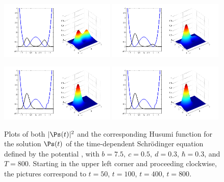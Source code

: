 \documentclass[12pt]{article}
\begin{document}
\begin{figure}[t]
\begin{center}
\includegraphics[width=0.49\textwidth]{50.png}
\includegraphics[width=0.49\textwidth]{100.png}
\bigskip

\includegraphics[width=0.49\textwidth]{800.png}
\includegraphics[width=0.49\textwidth]{400.png}
\caption{Plots of both $|\Ps(t)|^2$ and the corresponding Husumi function for the solution $\Ps(t)$ of the  time-dependent Schr\"{o}dinger equation defined by the potential , with $b=7.5,\ c=0.5,\ d=0.3$, $\hbar=0.3$, and $T=800$. Starting in the upper left corner and proceeding clockwise, the pictures correspond to $t=50$, $t=100$, $t=400$, $t=800$. }
\label{figure8}
\end{center}
\end{figure}
\end{document}
